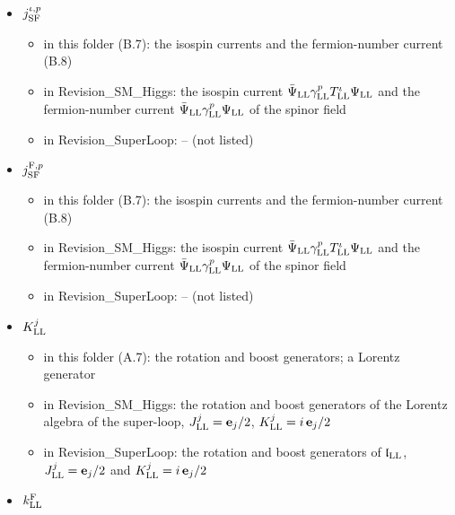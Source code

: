 \documentclass[
  10pt,
]{article}
\providecommand{\tightlist}{%
  \setlength{\itemsep}{0pt}\setlength{\parskip}{0pt}}
\begin{document}
\begin{itemize}
  \begin{itemize}
  \tightlist
  \item
    in this folder (A.7): the rotation and boost generators; a Lorentz
    generator
  \item
    in Revision\_SM\_Higgs: the rotation and boost generators of the
    Lorentz algebra of the super-loop, \(J^j_{\rm LL}=\mathbf e_j/2\),
    \(K^j_{\rm LL}=i\,\mathbf e_j/2\)
  \item
    in Revision\_SuperLoop: the rotation and boost generators of
    \(\mathfrak l_{\rm LL}\), \(J^j_{\rm LL}=\mathbf e_j/2\) and
    \(K^j_{\rm LL}=i\,\mathbf e_j/2\)
  \end{itemize}
\item
  \(j^{\iota,p}_{\rm SF}\)

  \begin{itemize}
  \tightlist
  \item
    in this folder (B.7): the isospin currents and the fermion-number
    current (B.8)
  \item
    in Revision\_SM\_Higgs: the isospin current
    \(\bar\Psi_{\rm LL}\gamma^p_{\rm LL}T^\iota_{\rm LL}\Psi_{\rm LL}\)
    and the fermion-number current
    \(\bar\Psi_{\rm LL}\gamma^p_{\rm LL}\Psi_{\rm LL}\) of the spinor
    field
  \item
    in Revision\_SuperLoop: -- (not listed)
  \end{itemize}
\item
  \(j^{{\rm F},p}_{\rm SF}\)

  \begin{itemize}
  \tightlist
  \item
    in this folder (B.7): the isospin currents and the fermion-number
    current (B.8)
  \item
    in Revision\_SM\_Higgs: the isospin current
    \(\bar\Psi_{\rm LL}\gamma^p_{\rm LL}T^\iota_{\rm LL}\Psi_{\rm LL}\)
    and the fermion-number current
    \(\bar\Psi_{\rm LL}\gamma^p_{\rm LL}\Psi_{\rm LL}\) of the spinor
    field
  \item
    in Revision\_SuperLoop: -- (not listed)
  \end{itemize}
\item
  \(K^j_{\rm LL}\)

  \begin{itemize}
  \tightlist
  \item
    in this folder (A.7): the rotation and boost generators; a Lorentz
    generator
  \item
    in Revision\_SM\_Higgs: the rotation and boost generators of the
    Lorentz algebra of the super-loop, \(J^j_{\rm LL}=\mathbf e_j/2\),
    \(K^j_{\rm LL}=i\,\mathbf e_j/2\)
  \item
    in Revision\_SuperLoop: the rotation and boost generators of
    \(\mathfrak l_{\rm LL}\), \(J^j_{\rm LL}=\mathbf e_j/2\) and
    \(K^j_{\rm LL}=i\,\mathbf e_j/2\)
  \end{itemize}
\item
  \(k^{\rm F}_{\rm LL}\)


\end{itemize}
\end{document}
